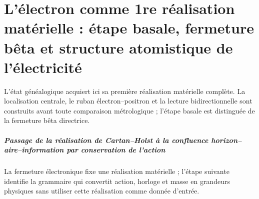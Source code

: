\chapter{L’électron comme 1re réalisation matérielle : étape basale, fermeture bêta et structure atomistique de l’électricité}
\label{chap:parte-iv-48}

L’état généalogique acquiert ici sa première réalisation matérielle complète. La localisation centrale, le ruban électron--positron et la lecture bidirectionnelle sont construits avant toute comparaison métrologique ; l’étape basale est distinguée de la fermeture bêta directrice.





\paragraph{Passage de la réalisation de Cartan–Holst à la confluence horizon–aire–information par conservation de l’action} La fermeture électronique fixe une réalisation matérielle ; l’étape suivante identifie la grammaire qui convertit action, horloge et masse en grandeurs physiques sans utiliser cette réalisation comme donnée d’entrée.
